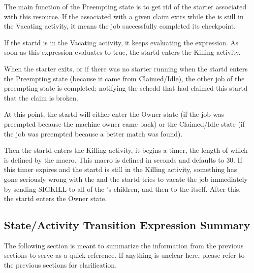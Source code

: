 The main function of the Preempting state is to get rid of the starter
associated with this resource.  If the  associated
with a given claim exits while the  is still in the
Vacating activity, it means the job successfully completed its
checkpoint.

If the startd is in the Vacating activity, it keeps evaluating the
 expression.  As soon as this expression evaluates to true,
the startd enters the Killing activity.

When the starter exits, or if there was no starter running when the
startd enters the Preempting state (because it came from
Claimed/Idle), the other job of the preempting state is completed:
notifying the schedd that had claimed this startd that the claim is
broken.

At this point, the startd will either enter the Owner state (if the
job was preempted because the machine owner came back) or the
Claimed/Idle state (if the job was preempted because a better match
was found).

Then the startd enters the Killing activity, it begins a timer, the
length of which is defined by the 
\label{param:KillingTimeout} macro.  This macro is defined in seconds 
and defaults to 30.  If this timer expires and the startd is still in
the Killing activity, something has gone seriously wrong with the
 and the startd tries to vacate the job immediately by
sending SIGKILL to all of the 's children, and then to
the  itself.  After this, the startd enters the Owner
state.  


\subsection{ State/Activity Transition Expression Summary}
\label{sec:State-Expression-Summary}
The following section is meant to summarize the information from the
previous sections to serve as a quick reference.  If anything is
unclear here, please refer to the previous sections for clarification.

